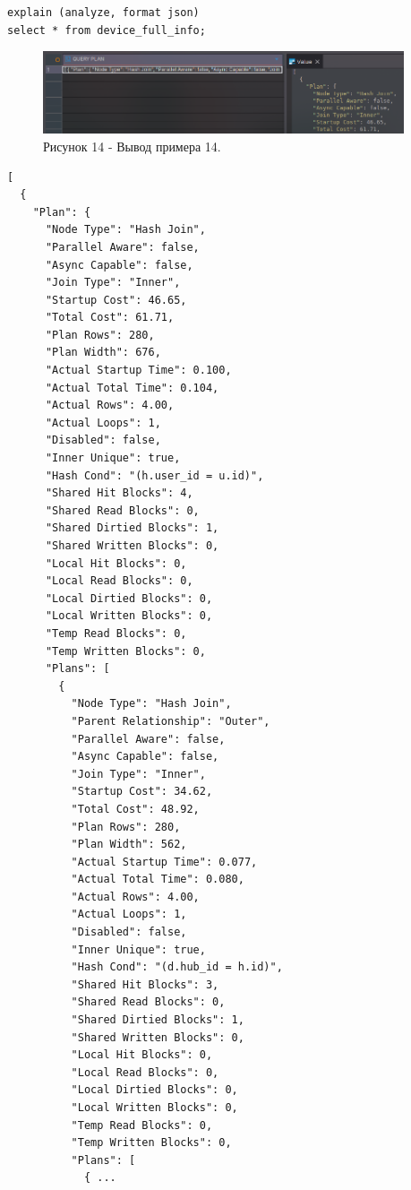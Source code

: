 \documentclass[oneside,a4paper,14pt]{extarticle}
\begin{document}
\begin{verbatim}
explain (analyze, format json) 
select * from device_full_info;
\end{verbatim}

\begin{figure}[H]
  \centering
  \includegraphics[width=0.95\textwidth]{pics/join.png}
  \caption*{Рисунок 14 - Вывод примера 14.}
\end{figure}

\begin{verbatim}
[
  {
    "Plan": {
      "Node Type": "Hash Join",
      "Parallel Aware": false,
      "Async Capable": false,
      "Join Type": "Inner",
      "Startup Cost": 46.65,
      "Total Cost": 61.71,
      "Plan Rows": 280,
      "Plan Width": 676,
      "Actual Startup Time": 0.100,
      "Actual Total Time": 0.104,
      "Actual Rows": 4.00,
      "Actual Loops": 1,
      "Disabled": false,
      "Inner Unique": true,
      "Hash Cond": "(h.user_id = u.id)",
      "Shared Hit Blocks": 4,
      "Shared Read Blocks": 0,
      "Shared Dirtied Blocks": 1,
      "Shared Written Blocks": 0,
      "Local Hit Blocks": 0,
      "Local Read Blocks": 0,
      "Local Dirtied Blocks": 0,
      "Local Written Blocks": 0,
      "Temp Read Blocks": 0,
      "Temp Written Blocks": 0,
      "Plans": [
        {
          "Node Type": "Hash Join",
          "Parent Relationship": "Outer",
          "Parallel Aware": false,
          "Async Capable": false,
          "Join Type": "Inner",
          "Startup Cost": 34.62,
          "Total Cost": 48.92,
          "Plan Rows": 280,
          "Plan Width": 562,
          "Actual Startup Time": 0.077,
          "Actual Total Time": 0.080,
          "Actual Rows": 4.00,
          "Actual Loops": 1,
          "Disabled": false,
          "Inner Unique": true,
          "Hash Cond": "(d.hub_id = h.id)",
          "Shared Hit Blocks": 3,
          "Shared Read Blocks": 0,
          "Shared Dirtied Blocks": 1,
          "Shared Written Blocks": 0,
          "Local Hit Blocks": 0,
          "Local Read Blocks": 0,
          "Local Dirtied Blocks": 0,
          "Local Written Blocks": 0,
          "Temp Read Blocks": 0,
          "Temp Written Blocks": 0,
          "Plans": [
            { ...
\end{verbatim}
\end{document}

